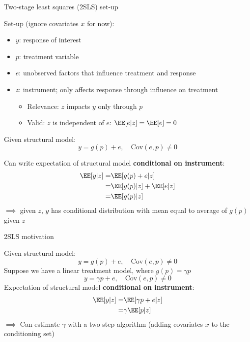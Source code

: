 \documentclass[compress, 8pt]{beamer}
\begin{document}
\begin{frame}{Two-stage least squares (2SLS) set-up}

Set-up (ignore covariates $x$ for now):
\begin{itemize}
    \item $y$: response of interest
    \item $p$: treatment variable
    \item $e$: unobserved factors that influence treatment and response
    \item $z$: instrument; only affects response through influence on treatment
    \begin{itemize}
        \item Relevance: $z$ impacts $y$ only through $p$
        \item Valid: $z$ is independent of $e$: $\EE [e \vert z] = \EE [e] = 0$
    \end{itemize}
\end{itemize}
\vspace{3ex}
Given structural model:
\begin{equation*}
    y = g(p) + e, \quad \text{Cov} (e, p) \neq 0
\end{equation*}

\vspace{3ex}
Can write expectation of structural model \textbf{conditional on instrument}:
\begin{align*}
    \EE [y \vert z] =& \EE [g(p) + e \vert z] \\
    =& \EE [g(p) \vert z] + \EE [e \vert z] \\
    =& \EE [g(p) \vert z]
\end{align*}
$\implies$ given $z$, $y$ has conditional distribution with mean equal to average of $g(p)$ given $z$

\end{frame}

\begin{frame}{2SLS motivation}

Given structural model:
\begin{equation*}
    y = g(p) + e, \quad \text{Cov} (e, p) \neq 0
\end{equation*}
Suppose we have a linear treatment model, where $g(p) = \gamma p$
\begin{equation*}
    y = \gamma p + e, \quad \text{Cov} (e, p) \neq 0
\end{equation*}
Expectation of structural model \textbf{conditional on instrument}:
\begin{align*}
    \EE [y \vert z] =& \EE [\gamma p + e \vert z] \\
    =& \gamma \EE [p \vert z] 
\end{align*}
$\implies$ Can estimate $\gamma$ with a two-step algorithm (adding covariates $x$ to the conditioning set)

\end{frame}
\end{document}

